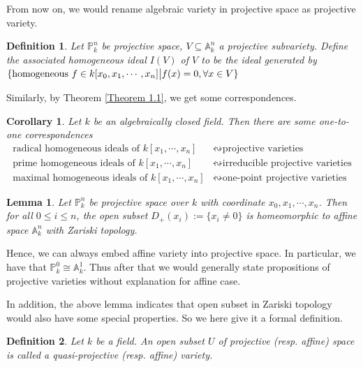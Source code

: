\documentclass{ctexart}
\newtheorem{definition}{Definition}[section]
\newtheorem{lemma}{Lemma}[section]
\newtheorem{corollary}{Corollary}[section]
\begin{document}
From now on, we would rename algebraic variety in projective space as projective variety.
\begin{definition}
    Let $\mathbb{P}_{k}^{n}$ be projective space, $V \subseteq \mathbb{A}_{k}^{n}$ a projective subvariety.
    Define the associated homogeneous ideal $I(V)$ of $V$ to be the ideal generated by $\{\text{homogeneous } f\in k[x_{0}, x_{1}, \cdots, x_{n}] \big{|} f(x) = 0, \forall x\in V\}$
\end{definition}
Similarly, by Theorem \ref{Theorem 1.1}, we get some correspondences.
\begin{corollary}
    Let $k$ be an algebraically closed field.
    Then there are some one-to-one correspondences
    \begin{equation*}
        \begin{split}
            \text{radical homogeneous ideals of $k[x_{1}, \cdots, x_{n}]$} & \leftrightsquigarrow \text{projective varieties} \\ 
            \text{prime homogeneous ideals of $k[x_{1}, \cdots, x_{n}]$} & \leftrightsquigarrow \text{irreducible projective varieties} \\ 
            \text{maximal homogeneous ideals of $k[x_{1}, \cdots, x_{n}]$} & \leftrightsquigarrow \text{one-point projective varieties} 
        \end{split}
    \end{equation*}
    \label{Corollary 2.1}
\end{corollary}
\vspace{-\baselineskip} %
\begin{lemma}
    Let $\mathbb{P}_{k}^{n}$ be projective space over $k$ with coordinate $x_{0}, x_{1}, \cdots, x_{n}$.
    Then for all $0 \le i \le n$, the open subset $D_{+}(x_{i}) := \{x_{i} \neq 0\}$ is homeomorphic to affine space $\mathbb{A}_{k}^{n}$ with Zariski topology.
    \label{Lemma 2.2}
\end{lemma}
Hence, we can always embed affine variety into projective space.
In particular, we have that $\mathbb{P}_{k}^{0} \cong \mathbb{A}_{k}^{1}$.
Thus after that we would generally state propositions of projective varieties without explanation for affine case.
\par
In addition, the above lemma indicates that open subset in Zariski topology would also have some special properties.
So we here give it a formal definition.
\begin{definition}
    Let $k$ be a field.
    An open subset $U$ of projective (resp. affine) space is called a quasi-projective (resp. affine) variety.
\end{definition}
\end{document}
